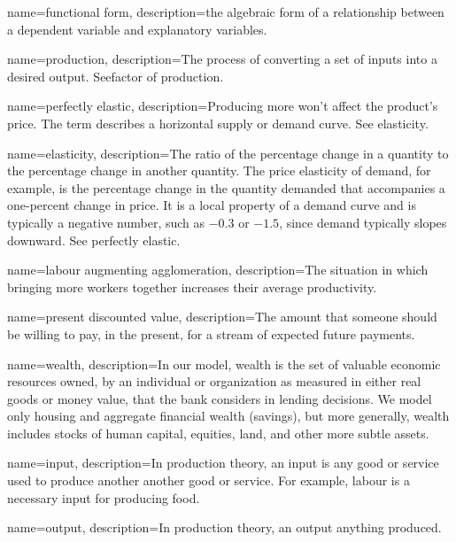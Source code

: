 {
name=functional form,
description={the algebraic form of a relationship between a dependent variable and explanatory variables.}
}

{
name=production,
description={The process of converting a set of \glspl{input} into a desired \gls{output}. See\gls{factor of production}.}
}

{
name=perfectly elastic,
description={Producing more won't affect the product's price. The term describes a  horizontal supply or demand curve. See \gls{elasticity}.} %
}

{
name=elasticity,
description={The ratio of the percentage change in a quantity to the percentage change in another quantity. The price elasticity of demand, for  example, is the percentage change in the quantity demanded that accompanies a one-percent change in price. It is a local property of a demand curve and is typically  a negative number, such as $-0.3$ or $-1.5$, since demand typically slopes downward. See \gls{perfectly elastic}.}
}

{
name=labour augmenting agglomeration,
description={The situation in which bringing more workers together increases their average productivity.}
}

{
name=present discounted value,
description={The amount that someone should be willing to pay, in the present, for a stream of expected future payments.}
}

{
name=wealth,
description={In our model, wealth is the set of valuable economic resources owned, by an individual or organization as measured in either real goods or money value, that the bank considers in lending decisions. We model only housing and aggregate financial wealth (savings), but more generally, wealth includes stocks of human capital, equities, land, and other more subtle assets.}
}

{
name=input,
description={In production theory, an input is any good or service used to produce another another good or service. %
For example, labour is a necessary input for producing food. }
}

{
name=output,
description={In production theory, an output anything produced.} %
}

